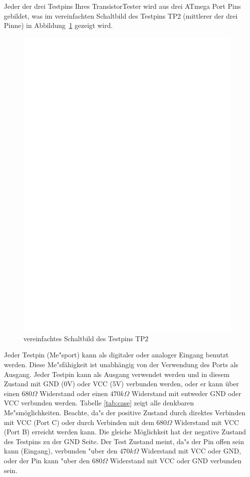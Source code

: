 Jeder der drei Testpins Ihres TransistorTester wird aus drei ATmega Port Pins gebildet,
was im vereinfachten Schaltbild des Testpins TP2 (mittlerer der drei Pinne) in Abbildung~\ref{fig:terminal} gezeigt wird.

\begin{figure}[H]
\centering
\includegraphics[]{../FIG/terminal.eps}
\caption{vereinfachtes Schaltbild des Testpins TP2}
\label{fig:terminal}
\end{figure}

Jeder Testpin (Me"sport) kann als digitaler oder analoger Eingang benutzt werden.
Diese Me"s\-f\"ahig\-keit ist un\-abh\"an\-gig von der Verwendung des Ports als Ausgang.
Jeder Testpin kann als Ausgang verwendet werden und in diesem Zustand mit GND (0V) oder VCC (5V) verbunden werden,
oder er kann \"uber einen \(680\Omega\) Widerstand oder einen \(470k\Omega\) Widerstand mit entweder GND oder VCC verbunden werden.
Tabelle \ref{tab:case} zeigt alle denkbaren Me"sm\"oglichkeiten.
Beachte, da"s der positive Zustand durch direktes Verbinden mit VCC (Port C) oder
durch Verbinden mit dem \(680\Omega\) Widerstand mit VCC (Port B) erreicht werden kann.
Die gleiche M\"oglichkeit hat der negative Zustand des Testpins zu der GND Seite.
Der Test Zustand meint, da"s der Pin offen sein kann (Eingang), verbunden "uber den \(470k\Omega\) Widerstand
mit VCC oder GND, oder der Pin kann "uber den \(680\Omega\) Widerstand mit VCC oder GND verbunden sein.

